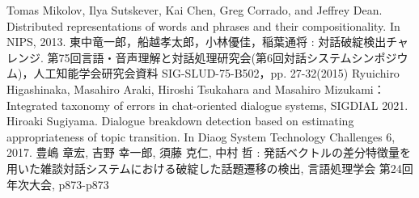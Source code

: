 \documentclass[upLaTex, 10pt,dvipdfmx,a4paper,twocolumn]{jsarticle}
\begin{document}
 
 
\begin{thebibliography}{99}
     Tomas Mikolov, Ilya Sutskever, Kai Chen, Greg Corrado, and Jeffrey Dean. Distributed representations of words and phrases and their compositionality. In NIPS, 2013.
     東中竜一郎，船越孝太郎，小林優佳，稲葉通将 : 対話破綻検出チャレンジ. 第75回言語・音声理解と対話処理研究会(第6回対話システムシンポジウム)，人工知能学会研究会資料 SIG-SLUD-75-B502，pp. 27-32(2015)
     Ryuichiro Higashinaka, Masahiro Araki, Hiroshi Tsukahara and Masahiro Mizukami：Integrated taxonomy of errors in chat-oriented dialogue systems,  SIGDIAL 2021.
     Hiroaki Sugiyama. Dialogue breakdown detection based on estimating appropriateness of topic transition. In Diaog System Technology Challenges 6, 2017.
     豊嶋 章宏, 吉野 幸一郎, 須藤 克仁, 中村 哲 : 発話ベクトルの差分特徴量を用いた雑談対話システムにおける破綻した話題遷移の検出, 言語処理学会 第24回年次大会, p873-p873


\end{thebibliography}
\end{document}
